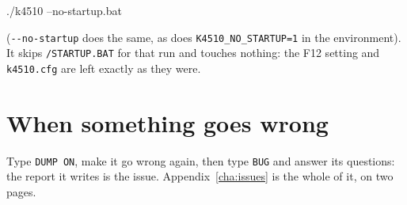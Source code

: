 \begin{type}
./k4510 --no-startup.bat
\end{type}

\noindent (\verb|--no-startup| does the same, as does
\verb|K4510_NO_STARTUP=1| in the environment). It skips
\texttt{/STARTUP.BAT} for that run and touches nothing: the F12 setting
and \texttt{k4510.cfg} are left exactly as they were.

\section{When something goes wrong}
Type \verb|DUMP ON|, make it go wrong again, then type \verb|BUG| and
answer its questions: the report it writes is the issue.
Appendix~\ref{cha:issues} is the whole of it, on two pages.
